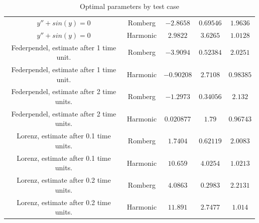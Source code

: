 \begin{table}[H]
\begin{tabular}{c|c||c|c|c}
$y'' + sin(y) = 0$ & Romberg & \(-2.8658\) & \(0.69546\) & \(1.9636\) \\
$y'' + sin(y) = 0$ & Harmonic & \(2.9822\) & \(3.6265\) & \(1.0128\) \\
Federpendel, estimate after 1 time unit. & Romberg & \(-3.9094\) & \(0.52384\) & \(2.0251\) \\
Federpendel, estimate after 1 time unit. & Harmonic & \(-0.90208\) & \(2.7108\) & \(0.98385\)\\
Federpendel, estimate after 2 time units. & Romberg & \(-1.2973\) & \(0.34056\) & \(2.132\)\\
Federpendel, estimate after 2 time units. & Harmonic & \(0.020877\) & \(1.79\) & \(0.96743\)\\
Lorenz, estimate after 0.1 time units. & Romberg & \(1.7404\) & \(0.62119\) & \(2.0083\)\\
Lorenz, estimate after 0.1 time units. & Harmonic & \(10.659\) & \(4.0254\) & \(1.0213\) \\
Lorenz, estimate after 0.2 time units. & Romberg & \(4.0863\) & \(0.2983\) & \(2.2131\)  \\
Lorenz, estimate after 0.2 time units. & Harmonic & \(11.891\) & \(2.7477\) & \(1.014\)\\
    \end{tabular}
    \caption{Optimal parameters by test case}
    \label{tab:my_label}
\end{table}